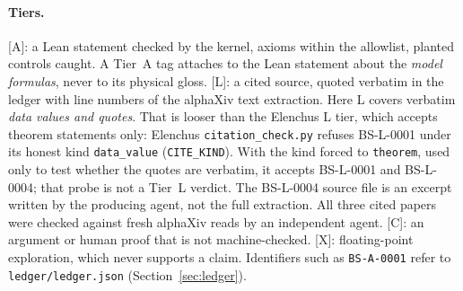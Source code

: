 \documentclass[11pt]{article}
\theoremstyle{remark}
\newcommand{\tier}[1]{\textsf{[#1]}}
\newcommand{\ks}{k_s}
\begin{document}
\begin{abstract}
\textbf{Real data} (Tier L inputs, Tier X evaluation). Using the published $^4$He dispersion table, the threshold at the
roton is $\sqrt{Q_R/2\ks}=\HeThrQR$. Assuming Feynman's inequality, the dispersion table alone says the test is silent
for $k\le\HeSilentHi$\,\AA$^{-1}$ and cannot decide from $\HeFirstUnd$\,\AA$^{-1}$ upward, including the roton.

\textbf{Unmet deliverable: HuggingFace.} The task asked for a HuggingFace dataset to illustrate the result. That was not delivered:
a search of \HFQueries{} HuggingFace queries found no structure-factor dataset, so no HuggingFace data illustrate this
paper. The published $^4$He table, which is not on HuggingFace, is the real-data illustration instead.

There is no novelty in mathematics or physics: the core inequality is $(k-\ks)^2\ge0$. What is offered is a
kernel-checked statement in the owner project's vocabulary, a tested solver extension, and honest bookkeeping.
\end{abstract}

\paragraph{Tiers.} \tier{A}: a Lean statement checked by the kernel, axioms within the allowlist, planted controls
caught. A Tier~A tag attaches to the Lean statement about the \emph{model formulas}, never to its physical gloss.
\tier{L}: a cited source, quoted verbatim in the ledger with line numbers of the alphaXiv text extraction. Here L
covers verbatim \emph{data values and quotes}. That is looser than the Elenchus L tier, which accepts theorem
statements only: Elenchus \texttt{citation\_check.py} refuses BS-L-0001 under its honest kind \texttt{data\_value}
(\texttt{CITE\_KIND}). With the kind forced to \texttt{theorem}, used only to test whether the quotes are verbatim, it
accepts BS-L-0001 and BS-L-0004; that probe is not a Tier~L verdict. The BS-L-0004 source file is an excerpt written by
the producing agent, not the full extraction. All three cited papers were checked against fresh alphaXiv reads by an
independent agent.
\tier{C}: an argument or human proof that is not machine-checked. \tier{X}: floating-point exploration, which never
supports a claim. Identifiers such as \texttt{BS-A-0001} refer to \texttt{ledger/ledger.json}
(Section~\ref{sec:ledger}).
\end{document}
